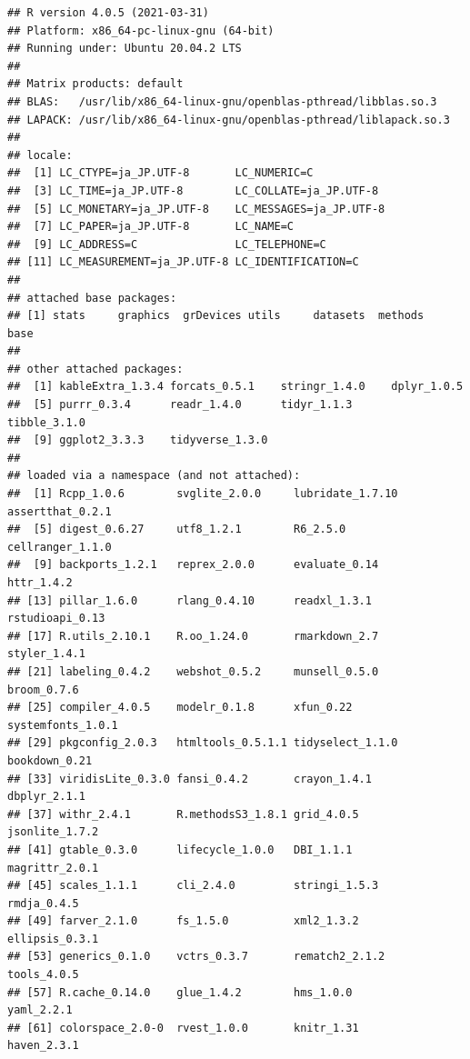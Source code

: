 \documentclass[
]{ltjsarticle}
\begin{document}
\begin{verbatim}
## R version 4.0.5 (2021-03-31)
## Platform: x86_64-pc-linux-gnu (64-bit)
## Running under: Ubuntu 20.04.2 LTS
## 
## Matrix products: default
## BLAS:   /usr/lib/x86_64-linux-gnu/openblas-pthread/libblas.so.3
## LAPACK: /usr/lib/x86_64-linux-gnu/openblas-pthread/liblapack.so.3
## 
## locale:
##  [1] LC_CTYPE=ja_JP.UTF-8       LC_NUMERIC=C              
##  [3] LC_TIME=ja_JP.UTF-8        LC_COLLATE=ja_JP.UTF-8    
##  [5] LC_MONETARY=ja_JP.UTF-8    LC_MESSAGES=ja_JP.UTF-8   
##  [7] LC_PAPER=ja_JP.UTF-8       LC_NAME=C                 
##  [9] LC_ADDRESS=C               LC_TELEPHONE=C            
## [11] LC_MEASUREMENT=ja_JP.UTF-8 LC_IDENTIFICATION=C       
## 
## attached base packages:
## [1] stats     graphics  grDevices utils     datasets  methods   base     
## 
## other attached packages:
##  [1] kableExtra_1.3.4 forcats_0.5.1    stringr_1.4.0    dplyr_1.0.5     
##  [5] purrr_0.3.4      readr_1.4.0      tidyr_1.1.3      tibble_3.1.0    
##  [9] ggplot2_3.3.3    tidyverse_1.3.0 
## 
## loaded via a namespace (and not attached):
##  [1] Rcpp_1.0.6        svglite_2.0.0     lubridate_1.7.10  assertthat_0.2.1 
##  [5] digest_0.6.27     utf8_1.2.1        R6_2.5.0          cellranger_1.1.0 
##  [9] backports_1.2.1   reprex_2.0.0      evaluate_0.14     httr_1.4.2       
## [13] pillar_1.6.0      rlang_0.4.10      readxl_1.3.1      rstudioapi_0.13  
## [17] R.utils_2.10.1    R.oo_1.24.0       rmarkdown_2.7     styler_1.4.1     
## [21] labeling_0.4.2    webshot_0.5.2     munsell_0.5.0     broom_0.7.6      
## [25] compiler_4.0.5    modelr_0.1.8      xfun_0.22         systemfonts_1.0.1
## [29] pkgconfig_2.0.3   htmltools_0.5.1.1 tidyselect_1.1.0  bookdown_0.21    
## [33] viridisLite_0.3.0 fansi_0.4.2       crayon_1.4.1      dbplyr_2.1.1     
## [37] withr_2.4.1       R.methodsS3_1.8.1 grid_4.0.5        jsonlite_1.7.2   
## [41] gtable_0.3.0      lifecycle_1.0.0   DBI_1.1.1         magrittr_2.0.1   
## [45] scales_1.1.1      cli_2.4.0         stringi_1.5.3     rmdja_0.4.5      
## [49] farver_2.1.0      fs_1.5.0          xml2_1.3.2        ellipsis_0.3.1   
## [53] generics_0.1.0    vctrs_0.3.7       rematch2_2.1.2    tools_4.0.5      
## [57] R.cache_0.14.0    glue_1.4.2        hms_1.0.0         yaml_2.2.1       
## [61] colorspace_2.0-0  rvest_1.0.0       knitr_1.31        haven_2.3.1
\end{verbatim}


\renewcommand\refname{参考文献}
  
\end{document}
